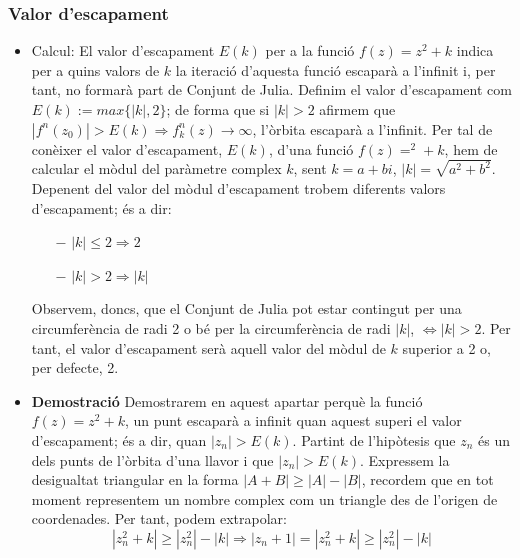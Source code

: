\documentclass[12pt]{report}
\begin{document}
\subsubsection{Valor d'escapament}
\begin{itemize}
    \item Calcul:
    \newline
    El valor d'escapament $E(k)$ per a la funció $f(z)=z^2+k$ indica per a quins valors de $k$ la iteració d'aquesta funció escaparà a l'infinit i, per tant, no formarà part de Conjunt de Julia.
    \newline
    Definim el valor d'escapament com $E(k):= max\{|k|,2\}$; de forma que si $|k|>2$ afirmem que $|f^n(z_0)|> E(k) \Rightarrow f^n_k(z)\rightarrow \infty$, l'òrbita escaparà a l'infinit.
    \newline
    Per tal de conèixer el valor d'escapament, $E(k)$, d'una funció $f(z)=^2+k$, hem de calcular el mòdul del paràmetre complex $k$, sent $k=a+bi$, $|k|= \sqrt{a^2+b^2}$.
    \newline
    Depenent del valor del mòdul d'escapament trobem diferents valors d'escapament; és a dir:
    \begin{itemize}
        \item [$-$] $|k| \leq 2 \Rightarrow 2$
        \item [$-$] $|k| > 2 \Rightarrow |k|$
    \end{itemize}
   Observem, doncs, que el Conjunt de Julia pot estar contingut per una circumferència de radi 2 o bé per la circumferència de radi $|k|$, $\Leftrightarrow|k|>2$.
    \newline
    Per tant, el valor d'escapament serà aquell valor del mòdul de $k$ superior a 2 o, per defecte, 2.
    \item \textbf{Demostració}
    \newline
    Demostrarem en aquest apartar perquè la funció $f(z)=z^2+k$, un punt escaparà a infinit quan aquest superi el valor d'escapament; és a dir, quan $|z_n|>E(k)$.
    \newline
   Partint de l'hipòtesis que $z_n$ és un dels punts de l'òrbita d'una llavor i que $|z_n|>E(k)$. 
    \newline 
   Expressem la desigualtat triangular en la forma $|A+B| \geq |A|-|B|$, recordem que en tot moment representem un nombre complex com un triangle des de l'origen de coordenades.
    \newline
    Per tant, podem extrapolar:
    $$|z_n^2+k| \geq |z_n^2| -|k| \Rightarrow |z_n+1| = |z_n^2+k| \geq |z_n^2| - |k|$$

\end{itemize}
\end{document}
